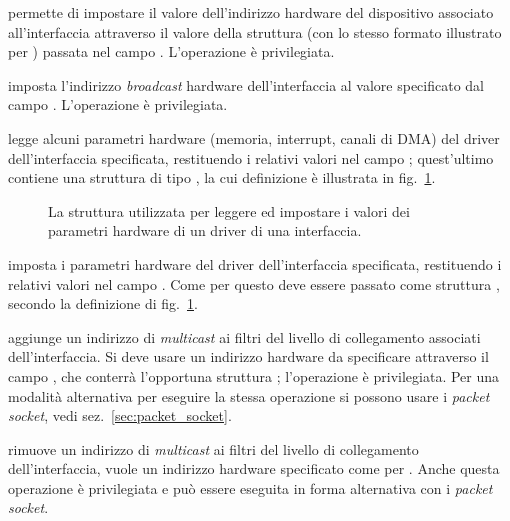 \begin{basedescript}{\desclabelwidth{1.5cm}\desclabelstyle{\nextlinelabel}}
\item[\constd{SIOCSIFHWADDR}] permette di impostare il valore dell'indirizzo
  hardware del dispositivo associato all'interfaccia attraverso il valore
  della struttura  (con lo stesso formato illustrato per
  ) passata nel campo . L'operazione è
  privilegiata.

\item[\constd{SIOCSIFHWBROADCAST}] imposta l'indirizzo \textit{broadcast}
  hardware dell'interfaccia al valore specificato dal campo
  . L'operazione è privilegiata.

\item[\constd{SIOCGIFMAP}] legge alcuni parametri hardware (memoria, interrupt,
  canali di DMA) del driver dell'interfaccia specificata, restituendo i
  relativi valori nel campo ; quest'ultimo contiene una
  struttura di tipo , la cui definizione è illustrata in
  fig.~\ref{fig:netdevice_ifmap_struct}.

\begin{figure}[!htb]
  \footnotesize \centering
  \begin{minipage}[c]{0.80\textwidth}
  \end{minipage}
  \caption{La struttura  utilizzata per leggere ed impostare i
    valori dei parametri hardware di un driver di una interfaccia.}
  \label{fig:netdevice_ifmap_struct}
\end{figure}

\item[\constd{SIOCSIFMAP}] imposta i parametri hardware del driver
  dell'interfaccia specificata, restituendo i relativi valori nel campo
  . Come per  questo deve essere passato come
  struttura , secondo la definizione di
  fig.~\ref{fig:netdevice_ifmap_struct}.

\item[\constd{SIOCADDMULTI}] aggiunge un indirizzo di \textit{multicast} ai
  filtri del livello di collegamento associati dell'interfaccia. Si deve usare
  un indirizzo hardware da specificare attraverso il campo ,
  che conterrà l'opportuna struttura ; l'operazione è
  privilegiata. Per una modalità alternativa per eseguire la stessa operazione
  si possono usare i \textit{packet socket}, vedi
  sez.~\ref{sec:packet_socket}.

\item[\constd{SIOCDELMULTI}] rimuove un indirizzo di \textit{multicast} ai
  filtri del livello di collegamento dell'interfaccia, vuole un indirizzo
  hardware specificato come per . Anche questa operazione
  è privilegiata e può essere eseguita in forma alternativa con i
  \textit{packet socket}.


\end{basedescript}
